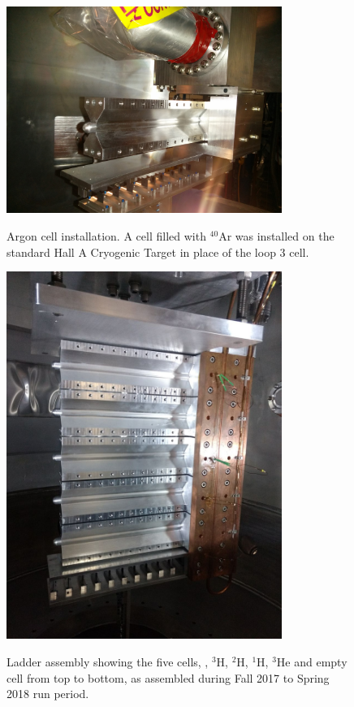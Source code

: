 \documentclass[review,numbers,sort&compress]{elsarticle}
\begin{document}
\begin{figure}[htbp]
	\centering
	\includegraphics[width=0.8\textwidth]{images/Ar-cell.jpg}\\
	\caption{Argon cell installation. A cell filled with $^{40}$Ar was installed on the standard Hall A Cryogenic Target in place of the loop 3 cell.}
	\label{argon}
\end{figure}

\begin{figure}[htbp]
  \centering
  \includegraphics[width=0.8\textwidth]{images/ladder.jpg}\\
  \caption{Ladder assembly showing the five cells, , $^{3}$H, $^{2}$H, $^{1}$H, $^{3}$He and empty cell from top to bottom, 
           as assembled during Fall 2017 to Spring 2018 run period.}
  \label{ladder}
\end{figure}
\end{document}
